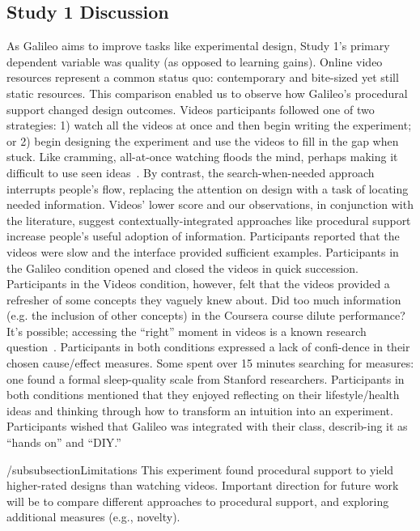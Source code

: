 \subsection{Study 1 Discussion}
As Galileo aims to improve tasks like experimental design, Study 1’s primary dependent variable was quality (as opposed to learning gains). Online video resources represent a common status quo: contemporary and bite-sized yet still static resources. This comparison enabled us to observe how Galileo’s procedural support changed design outcomes. Videos participants followed one of two strategies: 1) watch all the videos at once and then begin writing the experiment; or 2) begin designing the experiment and use the videos to fill in the gap when stuck. Like cramming, all-at-once watching floods the mind, perhaps making it difficult to use seen ideas~\cite{kornell2009optimising}. By contrast, the search-when-needed approach interrupts people’s flow, replacing the attention on design with a task of locating needed information. Videos’ lower score and our observations, in conjunction with the literature, suggest contextually-integrated approaches like procedural support increase people’s useful adoption of information.   
Participants reported that the videos were slow and the interface provided sufficient examples. Participants in the Galileo condition opened and closed the videos in quick succession. Participants in the Videos condition, however, felt that the videos provided a refresher of some concepts they vaguely knew about. Did too much information (e.g. the inclusion of other concepts) in the Coursera course dilute performance? It’s possible; accessing the “right” moment in videos is a known research question~\cite{kim2014crowdsourcing}. 
Participants in both conditions expressed a lack of confi-dence in their chosen cause/effect measures. Some spent over 15 minutes searching for measures: one found a formal sleep-quality scale from Stanford researchers. Participants in both conditions mentioned that they enjoyed reflecting on their lifestyle/health ideas and thinking through how to transform an intuition into an experiment. Participants wished that Galileo was integrated with their class, describ-ing it as “hands on” and “DIY.” 

/subsubsection{Limitations}
This experiment found procedural support to yield higher-rated designs than watching videos. Important direction for future work will be to compare different approaches to procedural support, and exploring additional measures (e.g., novelty). 

